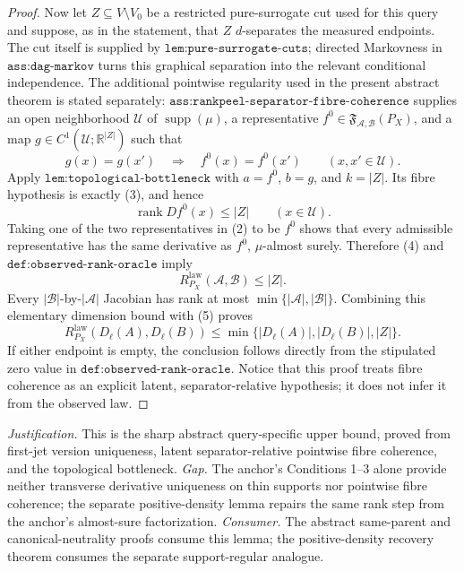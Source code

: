\documentclass{article}
\begin{document}
\begin{proof}
Now let \(Z\subseteq V\setminus V_0\) be a restricted pure-surrogate cut used for this query and suppose, as in the statement, that \(Z\) \(d\)-separates the measured endpoints.  The cut itself is supplied by \(\texttt{lem:pure-surrogate-cuts}\); directed Markovness in \(\texttt{ass:dag-markov}\) turns this graphical separation into the relevant conditional independence.  The additional pointwise regularity used in the present abstract theorem is stated separately: \(\texttt{ass:rankpeel-separator-fibre-coherence}\) supplies an open neighborhood \(\mathcal U\) of \(\operatorname{supp}(\mu)\), a representative \(f^0\in\mathfrak F_{\mathcal A,\mathcal B}(P_X)\), and a map \(g\in C^1(\mathcal U;\mathbb R^{|Z|})\) such that
\[
 g(x)=g(x')\quad\Longrightarrow\quad f^0(x)=f^0(x')
 \qquad(x,x'\in\mathcal U). \tag{3}
\]
Apply \(\texttt{lem:topological-bottleneck}\) with \(a=f^0\), \(b=g\), and \(k=|Z|\).  Its fibre hypothesis is exactly (3), and hence
\[
 \operatorname{rank}Df^0(x)\leq |Z|
 \qquad(x\in\mathcal U). \tag{4}
\]
Taking one of the two representatives in (2) to be \(f^0\) shows that every admissible representative has the same derivative as \(f^0\), \(\mu\)-almost surely.  Therefore (4) and \(\texttt{def:observed-rank-oracle}\) imply
\[
 R^{\mathrm{law}}_{P_X}(\mathcal A,\mathcal B)\leq |Z|. \tag{5}
\]
Every \(|\mathcal B|\)-by-\(|\mathcal A|\) Jacobian has rank at most \(\min\{|\mathcal A|,|\mathcal B|\}\).  Combining this elementary dimension bound with (5) proves
\[
 R^{\mathrm{law}}_{P_X}(D_\ell(A),D_\ell(B))
 \leq
 \min\{|D_\ell(A)|,|D_\ell(B)|,|Z|\}.
\]
If either endpoint is empty, the conclusion follows directly from the stipulated zero value in \(\texttt{def:observed-rank-oracle}\).  Notice that this proof treats fibre coherence as an explicit latent, separator-relative hypothesis; it does not infer it from the observed law.
\end{proof}
\par\smallskip\noindent \textit{Justification.} This is the sharp abstract query-specific upper bound, proved from first-jet version uniqueness, latent separator-relative pointwise fibre coherence, and the topological bottleneck. \textit{Gap.} The anchor's Conditions 1--3 alone provide neither transverse derivative uniqueness on thin supports nor pointwise fibre coherence; the separate positive-density lemma repairs the same rank step from the anchor's almost-sure factorization. \textit{Consumer.} The abstract same-parent and canonical-neutrality proofs consume this lemma; the positive-density recovery theorem consumes the separate support-regular analogue.
\end{document}
